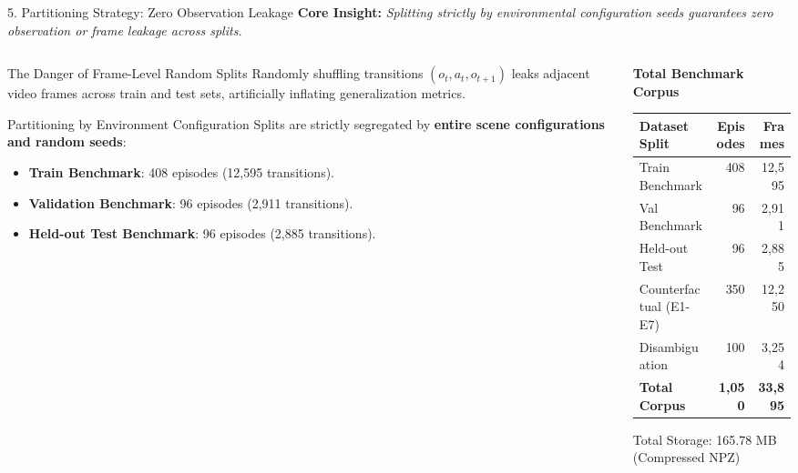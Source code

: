 \documentclass[aspectratio=169, 10pt]{beamer}
\begin{document}
\begin{frame}{5. Partitioning Strategy: Zero Observation Leakage}
  \textbf{Core Insight:} \textit{Splitting strictly by environmental configuration seeds guarantees zero observation or frame leakage across splits.}

  \vspace{0.2cm}
  \begin{columns}[T]
    \begin{column}{0.55\textwidth}
      \begin{block}{The Danger of Frame-Level Random Splits}
        \small
        Randomly shuffling transitions $(o_t, a_t, o_{t+1})$ leaks adjacent video frames across train and test sets, artificially inflating generalization metrics.
      \end{block}

      \vspace{0.15cm}
      \begin{block}{Partitioning by Environment Configuration}
        \small
        Splits are strictly segregated by \textbf{entire scene configurations and random seeds}:
        \begin{itemize}
          \item \textbf{Train Benchmark}: 408 episodes (12,595 transitions).
          \item \textbf{Validation Benchmark}: 96 episodes (2,911 transitions).
          \item \textbf{Held-out Test Benchmark}: 96 episodes (2,885 transitions).
        \end{itemize}
      \end{block}
    \end{column}

    \begin{column}{0.42\textwidth}
      \centering
      \small
      \textbf{Total Benchmark Corpus}\\[4pt]
      \begin{tabular}{lrr}
        \toprule
        \textbf{Dataset Split} & \textbf{Episodes} & \textbf{Frames} \\
        \midrule
        Train Benchmark & 408 & 12,595 \\
        Val Benchmark & 96 & 2,911 \\
        Held-out Test & 96 & 2,885 \\
        Counterfactual (E1-E7) & 350 & 12,250 \\
        Disambiguation & 100 & 3,254 \\
        \midrule
        \textbf{Total Corpus} & \textbf{1,050} & \textbf{33,895} \\
        \bottomrule
      \end{tabular}
      \vspace{0.2cm}
      \footnotesize
      Total Storage: 165.78 MB (Compressed NPZ)
    \end{column}
  \end{columns}
\end{frame}
\end{document}
